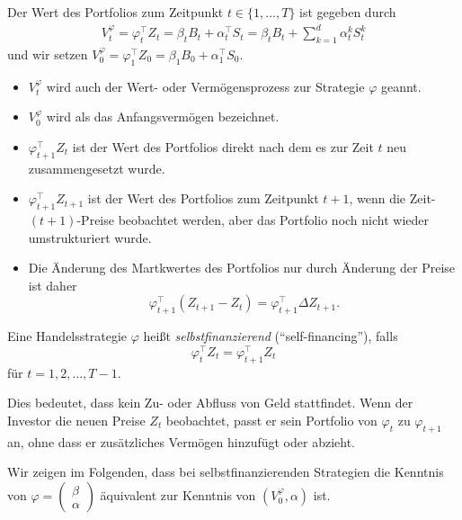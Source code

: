 \documentclass[a4paper,twoside,DIV15,BCOR12mm]{scrbook}
\begin{document}
\begin{definition}
\label{def:2.3.2}Der Wert des Portfolios zum Zeitpunkt $t\in\{1,\ldots,T\}$ ist gegeben durch 
\begin{align*}
V_t^\varphi  = \varphi_t^\top Z_t = \beta_t B_t + \alpha_t^\top S_t = \beta_tB_t + \sum_{k=1}^d \alpha_t^kS_t^k
\end{align*}
und wir setzen $V_0^\varphi = \varphi_1^\top Z_0 = \beta_1B_0 + \alpha_1^\top S_0$.
\end{definition}

\begin{bemerkung}
\begin{itemize}
\item $V_t^\varphi$ wird auch der Wert- oder Vermögensprozess zur Strategie $\varphi$ geannt.
\item $V_0^\varphi$ wird als das Anfangsvermögen bezeichnet.
\item $\varphi_{t+1}^\top Z_t$ ist der Wert des Portfolios direkt nach dem es zur Zeit $t$ neu zusammengesetzt wurde.
\item $\varphi_{t+1}^\top Z_{t+1}$ ist der Wert des Portfolios zum Zeitpunkt $t+1$, wenn die Zeit-$(t+1)$-Preise beobachtet werden, aber das Portfolio noch nicht wieder umstrukturiert wurde.
\item Die Änderung des Martkwertes des Portfolios nur durch Änderung der Preise ist daher
\[
\varphi_{t+1}^\top (Z_{t+1}-Z_t) = \varphi_{t+1}^\top \Delta Z_{t+1}.
\]
\end{itemize}
\end{bemerkung}

\begin{definition}
Eine Handelsstrategie $\varphi$ heißt \emph{selbstfinanzierend} (“self-financing”), falls
\[
\varphi_t^\top Z_t = \varphi_{t+1}^\top Z_t
\]
für $t=1, 2,\ldots,T-1$.
\end{definition}

Dies bedeutet, dass kein Zu- oder Abfluss von Geld stattfindet. Wenn der Investor die neuen Preise $Z_t$ beobachtet, passt er sein Portfolio von $\varphi_t$ zu $\varphi_{t+1}$ an, ohne dass er zusätzliches Vermögen hinzufügt oder abzieht.

Wir zeigen im Folgenden, dass bei selbstfinanzierenden Strategien die Kenntnis von $\varphi 
=\left(\begin{smallmatrix}
\beta \\ \alpha
\end{smallmatrix}\right)$
äquivalent zur Kenntnis von $(V_0^\varphi, \alpha)$ ist.
\end{document}
